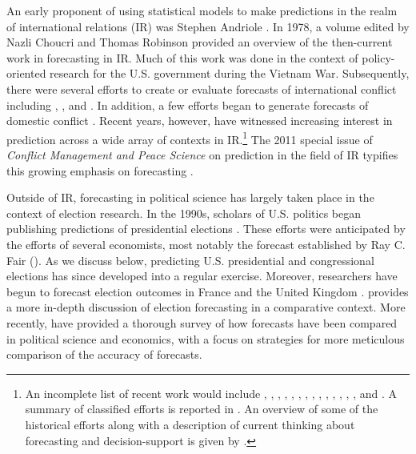 \documentclass[pdftex,12pt,fullpage,oneside]{amsart}
\begin{document}
An early proponent of using statistical models to make predictions in
the realm of international relations (IR) was Stephen Andriole
\citep{Andriole:Young:1977}. In 1978, a volume edited by Nazli Choucri
and Thomas Robinson \nocite{Choucri:Robinson:1978} provided an
overview of the then-current work in forecasting in IR.  Much of this
work was done in the context of policy-oriented research for the
U.S. government during the Vietnam War.  Subsequently, there were 
several efforts to create or evaluate forecasts of international
conflict including \citet{Freeman:Job:1979},
\citet{Singer:Wallace:1979}, and \citet{Vincent:1980}. In
addition, a few efforts began to generate forecasts of domestic
conflict \citep[e.g.,][]{Gurr:Lichbach:1986}.  Recent years,
however, have witnessed increasing interest in prediction across a
wide array of contexts in IR.\footnote{An incomplete list of recent
  work would include \citet{Krause:1997}, \citet{Davies:Gurr:1998},
  \citet{Pevehouse:Goldstein:1999}, \citet{Schrodt:Gerner:2000},
  \citet{King:Zeng:2001}, \citet{OBrien:2002}, \citet{BDM:2002},
  \citet{Fearon:Laitin:2003}, \citet{Demarchi:etal:2004}, \citet{Enders:Sandler:2005},
  \citet{Leblang:Satyanath:2006}, \citet{Ward:etal:2007},
  \citet{Brandt:etal:2008}, \citet{Bennett:Stam:2009}, and
  \citet{Gleditsch:Ward:2010}. A summary of classified efforts is
  reported in \citet{Feder:2002}.  An overview of some of the
  historical efforts along with a description of current thinking
  about forecasting and decision-support is given by
  \citet{OBrien:2010}.}  The 2011 special issue of \emph{Conflict
  Management and Peace Science} on prediction in the field of IR
typifies this growing emphasis on forecasting
\citep[c.f.,][]{Schneider_etal_2011, Mesquita_2011,
  Brandt_etal_2011}. 
  
Outside of IR, forecasting in political science has largely taken
place in the context of election research.  In the 1990s, scholars of
U.S. politics began publishing predictions of presidential elections
\citep{Campbell:1990, Campbell:1992}. These efforts were anticipated
by the efforts of several economists, most notably the forecast
established by Ray C. Fair (\citeyear{Fair:1978}). As we discuss
below, predicting U.S. presidential and congressional elections has
since developed into a regular exercise.  Moreover, researchers have
begun to forecast election outcomes in France
\citep[e.g.,][]{Jerome:1999} and the United Kingdom
\citep[e.g.,][]{Whitely:2005}. \citet{Lewis-Beck:2005} provides a more
in-depth discussion of election forecasting in a comparative context.
More recently, \citet{brandt:freeman:schrodt:2011} have provided a
thorough survey of how forecasts have been compared in political
science and economics, with a focus on strategies for more meticulous
comparison of the accuracy of forecasts.
\end{document}
